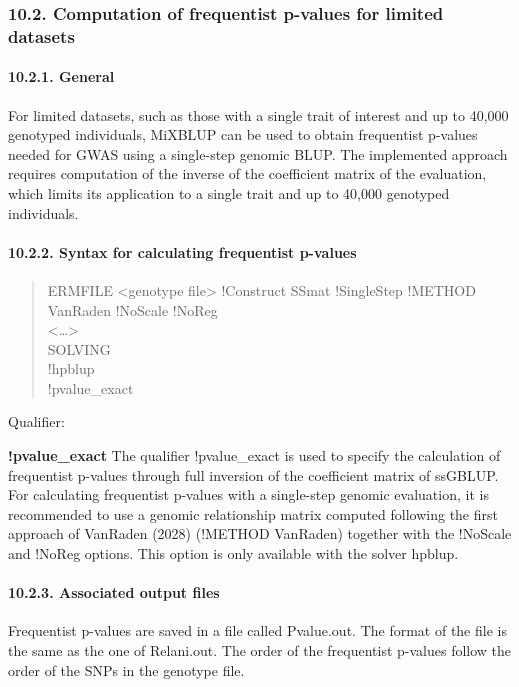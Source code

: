 \subsubsection{10.2. Computation of frequentist p-values for limited
datasets}\label{MTGW03}

\paragraph{10.2.1. General}\label{MTGW04}

For limited datasets, such as those with a single trait of interest and
up to 40,000 genotyped individuals, MiXBLUP can be used to obtain
frequentist p-values needed for GWAS using a single-step genomic BLUP.
The implemented approach requires computation of the inverse of the
coefficient matrix of the evaluation, which limits its application to a
single trait and up to 40,000 genotyped individuals.

\paragraph{10.2.2. Syntax for calculating frequentist
p-values}\label{MTGW05}

\begin{quote}
ERMFILE \textless genotype file\textgreater{} !Construct SSmat
!SingleStep !METHOD VanRaden !NoScale !NoReg\\
\textless\ldots\textgreater{}\\
SOLVING\\
!hpblup\\
!pvalue\_exact
\end{quote}

Qualifier:

\textbf{!pvalue\_exact} The qualifier !pvalue\_exact is used to specify
the calculation of frequentist p-values through full inversion of the
coefficient matrix of ssGBLUP. For calculating frequentist p-values with
a single-step genomic evaluation, it is recommended to use a genomic
relationship matrix computed following the first approach of VanRaden
(2028) (!METHOD VanRaden) together with the !NoScale and !NoReg options.
This option is only available with the solver hpblup.

\paragraph{10.2.3. Associated output files}\label{MTGW06}

Frequentist p-values are saved in a file called Pvalue.out. The format
of the file is the same as the one of Relani.out. The order of the
frequentist p-values follow the order of the SNPs in the genotype file.

